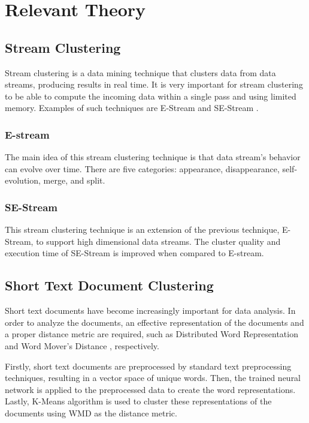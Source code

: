 \documentclass{IEEEtran}
\begin{document}

\section{Relevant Theory}
\subsection{Stream Clustering}
Stream clustering is a data mining technique that clusters data from data streams, producing results in real time. It is very important for stream clustering to be able to compute the incoming data within a single pass and using limited memory.
Examples of such techniques are E-Stream \cite{EStream} and SE-Stream \cite{SEStream}.

\subsubsection{E-stream} 
The main idea of this stream clustering technique is that data stream's behavior can evolve over time. There are five categories: appearance, disappearance, self-evolution, merge, and split.

\subsubsection{SE-Stream}
This stream clustering technique is an extension of the previous technique, E-Stream, to support high dimensional data streams. The cluster quality and execution time of SE-Stream is improved when compared to E-stream.

\subsection{Short Text Document Clustering}
Short text documents have become increasingly important for data analysis. In order to analyze the documents, an effective representation of the documents and a proper distance metric are required, such as Distributed Word Representation and Word Mover's Distance \cite{SText}, respectively.

Firstly, short text documents are preprocessed by standard text preprocessing techniques, resulting in a vector space of unique words. Then, the trained neural network is applied to the preprocessed data to create the word representations. Lastly, K-Means algorithm is used to cluster these representations of the documents using WMD as the distance metric.
\end{document}
